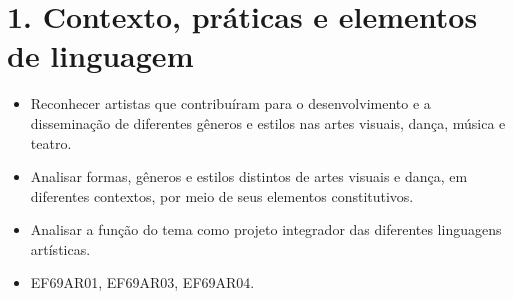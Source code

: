 \chapter{1. Contexto, práticas e elementos de linguagem}


\begin{itemize}
  \item Reconhecer artistas que contribuíram para o desenvolvimento e a disseminação de diferentes gêneros 
  e estilos nas artes visuais, dança, música e teatro.
  \item Analisar formas, gêneros e estilos distintos de artes visuais e dança, em diferentes contextos, por 
  meio de seus elementos constitutivos.
  \item Analisar a função do tema como projeto integrador das diferentes linguagens artísticas.
\end{itemize}


\begin{itemize}
  \item EF69AR01, EF69AR03, EF69AR04.
\end{itemize}


